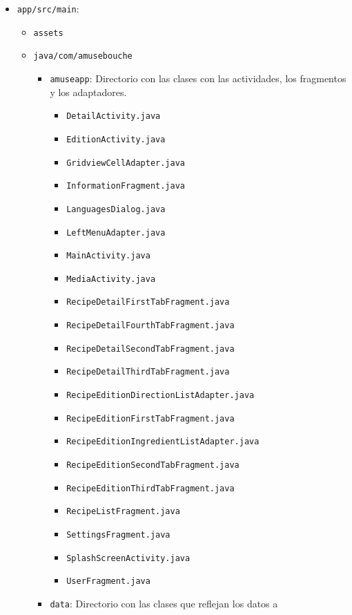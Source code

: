 \begin{itemize}
\item \texttt{app/src/main}:
  \begin{itemize}
  \item \texttt{assets}
  \item \texttt{java/com/amusebouche}
    \begin{itemize}
    \item \texttt{amuseapp}: Directorio con las clases con las actividades, los
      fragmentos y los adaptadores.
      \begin{itemize}
      \item \texttt{DetailActivity.java}
      \item \texttt{EditionActivity.java}
      \item \texttt{GridviewCellAdapter.java}
      \item \texttt{InformationFragment.java}
      \item \texttt{LanguagesDialog.java}
      \item \texttt{LeftMenuAdapter.java}
      \item \texttt{MainActivity.java}
      \item \texttt{MediaActivity.java}
      \item \texttt{RecipeDetailFirstTabFragment.java}
      \item \texttt{RecipeDetailFourthTabFragment.java}
      \item \texttt{RecipeDetailSecondTabFragment.java}
      \item \texttt{RecipeDetailThirdTabFragment.java}
      \item \texttt{RecipeEditionDirectionListAdapter.java}
      \item \texttt{RecipeEditionFirstTabFragment.java	}
      \item \texttt{RecipeEditionIngredientListAdapter.java}
      \item \texttt{RecipeEditionSecondTabFragment.java}
      \item \texttt{RecipeEditionThirdTabFragment.java	}
      \item \texttt{RecipeListFragment.java}
      \item \texttt{SettingsFragment.java}
      \item \texttt{SplashScreenActivity.java}
      \item \texttt{UserFragment.java}
      \end{itemize}
    \item \texttt{data}: Directorio con las clases que reflejan los datos a

\end{itemize}
\end{itemize}
\end{itemize}
